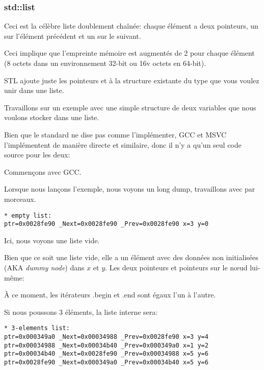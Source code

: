 \subsubsection{std::list}
\label{std_list}

Ceci est la célèbre liste doublement chaînée: chaque élément a deux pointeurs, un
sur l'élément précédent et un sur le suivant.

Ceci implique que l'empreinte mémoire est augmentés de 2  pour
chaque élément (8 octets dans un environnement 32-bit ou 16v octets en 64-bit).

\Cpp STL ajoute juste les pointeurs  et  à la structure existante
du type que vous voulez unir dans une liste.

Travaillons sur un exemple avec une simple structure de deux variables que nous voulons
stocker dans une liste.

Bien que le standard \Cpp ne dise pas comme l'implémenter, GCC et MSVC l'implémentent
de manière directe et similaire, donc il n'y a qu'un seul code source pour les deux:




Commençons avec GCC.

Lorsque nous lançons l'exemple, nous voyons un long dump, travaillons avec par morceaux.

\begin{lstlisting}
* empty list:
ptr=0x0028fe90 _Next=0x0028fe90 _Prev=0x0028fe90 x=3 y=0
\end{lstlisting}

Ici, nous voyons une liste vide.

Bien que ce soit une liste vide, elle a un élément avec des données non initialisées
(\ac{AKA} \emph{dummy node}) dans $x$ et $y$.
Les deux pointeurs  et  pointeurs sur le n\oe{}ud lui-même:



À ce moment, les itérateurs .begin et .end sont égaux l'un à l'autre.

Si nous poussons 3 éléments, la liste interne sera:

\begin{lstlisting}
* 3-elements list:
ptr=0x000349a0 _Next=0x00034988 _Prev=0x0028fe90 x=3 y=4
ptr=0x00034988 _Next=0x00034b40 _Prev=0x000349a0 x=1 y=2
ptr=0x00034b40 _Next=0x0028fe90 _Prev=0x00034988 x=5 y=6
ptr=0x0028fe90 _Next=0x000349a0 _Prev=0x00034b40 x=5 y=6
\end{lstlisting}

